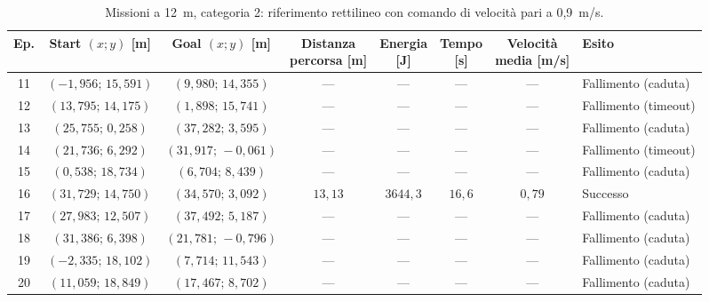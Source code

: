 \begin{table}[H]
\centering
\caption{Missioni a 12~m, categoria 2: riferimento rettilineo con comando di velocità pari a 0,9~m/s.}
\label{tab:straight-line-0-9-12m-cat2}
\begingroup
\fontsize{9}{11}\selectfont
\setlength{\tabcolsep}{2.5pt}
\renewcommand{\arraystretch}{1.2}
\begin{tabular}{@{}c cc cccc l@{}}
\toprule
Ep. & \shortstack{Start $(x;y)$\\{}[m]} & \shortstack{Goal $(x;y)$\\{}[m]} & \shortstack{Distanza\\percorsa [m]} & \shortstack{Energia\\{}[J]} & \shortstack{Tempo\\{}[s]} & \shortstack{Velocità\\media [m/s]} & Esito \\
\midrule
11 & $(-1{,}956;\,15{,}591)$ & $(9{,}980;\,14{,}355)$ & --- & --- & --- & --- & Fallimento (caduta) \\
12 & $(13{,}795;\,14{,}175)$ & $(1{,}898;\,15{,}741)$ & --- & --- & --- & --- & Fallimento (timeout) \\
13 & $(25{,}755;\,0{,}258)$ & $(37{,}282;\,3{,}595)$ & --- & --- & --- & --- & Fallimento (caduta) \\
14 & $(21{,}736;\,6{,}292)$ & $(31{,}917;\,-0{,}061)$ & --- & --- & --- & --- & Fallimento (timeout) \\
15 & $(0{,}538;\,18{,}734)$ & $(6{,}704;\,8{,}439)$ & --- & --- & --- & --- & Fallimento (caduta) \\
16 & $(31{,}729;\,14{,}750)$ & $(34{,}570;\,3{,}092)$ & $13{,}13$ & $3644{,}3$ & $16{,}6$ & $0{,}79$ & Successo \\
17 & $(27{,}983;\,12{,}507)$ & $(37{,}492;\,5{,}187)$ & --- & --- & --- & --- & Fallimento (caduta) \\
18 & $(31{,}386;\,6{,}398)$ & $(21{,}781;\,-0{,}796)$ & --- & --- & --- & --- & Fallimento (caduta) \\
19 & $(-2{,}335;\,18{,}102)$ & $(7{,}714;\,11{,}543)$ & --- & --- & --- & --- & Fallimento (caduta) \\
20 & $(11{,}059;\,18{,}849)$ & $(17{,}467;\,8{,}702)$ & --- & --- & --- & --- & Fallimento (caduta) \\
\bottomrule
\end{tabular}
\endgroup
\end{table}


